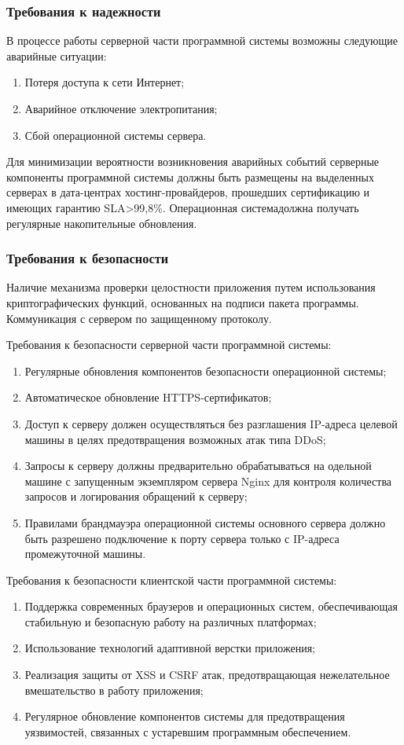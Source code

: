 \subsubsection{Требования к надежности}
В процессе работы серверной части программной системы возможны следующие аварийные ситуации:
\begin{enumerate}
\item Потеря доступа к сети Интернет;
\item Аварийное отключение электропитания;
\item Сбой операционной системы сервера.
\end{enumerate}

Для минимизации вероятности возникновения аварийных событий серверные компоненты программной системы должны быть размещены на выделенных серверах в дата-центрах хостинг-провайдеров, прошедших сертификацию и имеющих гарантию SLA>99,8\%. Операционная системадолжна получать регулярные накопительные обновления.

\subsubsection{Требования к безопасности}
Наличие механизма проверки целостности приложения путем использования криптографических функций, основанных на подписи пакета программы. Коммуникация с сервером по защищенному протоколу.

Требования к безопасности серверной части программной системы:
\begin{enumerate}
\item Регулярные обновления компонентов безопасности операционной системы;
\item Автоматическое обновление HTTPS-сертификатов;
\item Доступ к серверу должен осуществляться без разглашения IP-адреса целевой машины в целях предотвращения возможных атак типа DDoS;
\item Запросы к серверу должны предварительно обрабатываться на одельной машине с запущенным экземпляром сервера Nginx для контроля количества запросов и логирования обращений к серверу;
\item Правилами брандмауэра операционной системы основного сервера должно быть разрешено подключение к порту сервера только с IP-адреса промежуточной машины.
\end{enumerate}

Требования к безопасности клиентской части программной системы:
\begin{enumerate}
\item Поддержка современных браузеров и операционных систем, обеспечивающая стабильную и безопасную работу на различных платформах;
\item Использование технологий адаптивной верстки приложения;
\item Реализация защиты от XSS и CSRF атак, предотвращающая нежелательное вмешательство в работу приложения;
\item Регулярное обновление компонентов системы для предотвращения уязвимостей, связанных с устаревшим программным обеспечением.
\end{enumerate}

